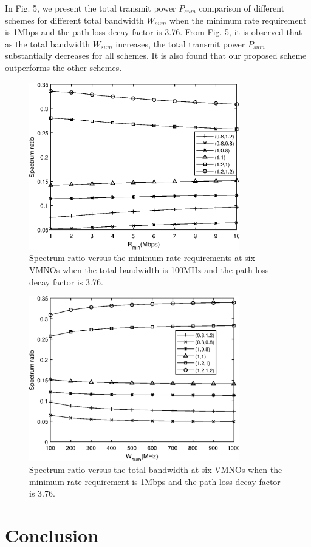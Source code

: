 \documentclass[journal]{IEEEtran}
\begin{document}
In Fig. 5, we present the total transmit power $P_{sum}$ comparison of different schemes for different total bandwidth $W_{sum}$ when the minimum rate requirement is 1Mbps and the path-loss decay factor is 3.76. From Fig. 5, it is observed that as the total bandwidth $W_{sum}$ increases, the total transmit power $P_{sum}$ substantially decreases for all schemes. It is also found that our proposed scheme outperforms the other schemes.

\begin{figure}
	\centering
	\includegraphics[width=3.6in]{SR_rmin.eps}
	\caption{Spectrum ratio versus the minimum rate requirements at six VMNOs when the total bandwidth is 100MHz and the path-loss decay factor is 3.76.}
\end{figure}


\begin{figure}
	\centering
	\includegraphics[width=3.6in]{SR_wsum.eps}
	\caption{Spectrum ratio versus the total bandwidth at six VMNOs when the minimum rate requirement is 1Mbps and the path-loss decay factor is 3.76.}
\end{figure}

\section{Conclusion}
\end{document}
